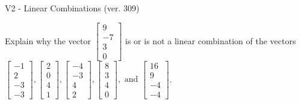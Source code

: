 \begin{exercise}
  \begin{exerciseTitle}V2 - Linear Combinations (ver. 309)\end{exerciseTitle}
  \begin{exerciseStatement}
    Explain why the vector \(\left[\begin{array}{c}
9 \\
-7 \\
3 \\
0
\end{array}\right]\)  is or is not a linear 
	combination of the vectors \(\left[\begin{array}{c}
-1 \\
2 \\
-3 \\
-3
\end{array}\right] , \left[\begin{array}{c}
2 \\
0 \\
4 \\
1
\end{array}\right] , \left[\begin{array}{c}
-4 \\
-3 \\
4 \\
2
\end{array}\right] , \left[\begin{array}{c}
8 \\
3 \\
4 \\
0
\end{array}\right] , \text{ and } \left[\begin{array}{c}
16 \\
9 \\
-4 \\
-4
\end{array}\right]\).
	



\end{exerciseStatement}
\end{exercise}
